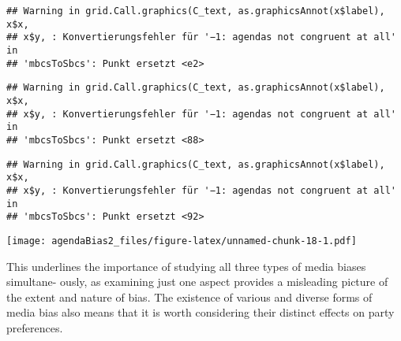 \documentclass[]{article}
\begin{document}
\begin{verbatim}
## Warning in grid.Call.graphics(C_text, as.graphicsAnnot(x$label), x$x,
## x$y, : Konvertierungsfehler für '−1: agendas not congruent at all' in
## 'mbcsToSbcs': Punkt ersetzt <e2>
\end{verbatim}

\begin{verbatim}
## Warning in grid.Call.graphics(C_text, as.graphicsAnnot(x$label), x$x,
## x$y, : Konvertierungsfehler für '−1: agendas not congruent at all' in
## 'mbcsToSbcs': Punkt ersetzt <88>
\end{verbatim}

\begin{verbatim}
## Warning in grid.Call.graphics(C_text, as.graphicsAnnot(x$label), x$x,
## x$y, : Konvertierungsfehler für '−1: agendas not congruent at all' in
## 'mbcsToSbcs': Punkt ersetzt <92>
\end{verbatim}

\texttt{[image: agendaBias2\_files/figure-latex/unnamed-chunk-18-1.pdf]}

This underlines the importance of studying all three types of media
biases simultane- ously, as examining just one aspect provides a
misleading picture of the extent and nature of bias. The existence of
various and diverse forms of media bias also means that it is worth
considering their distinct effects on party preferences.
\end{document}
